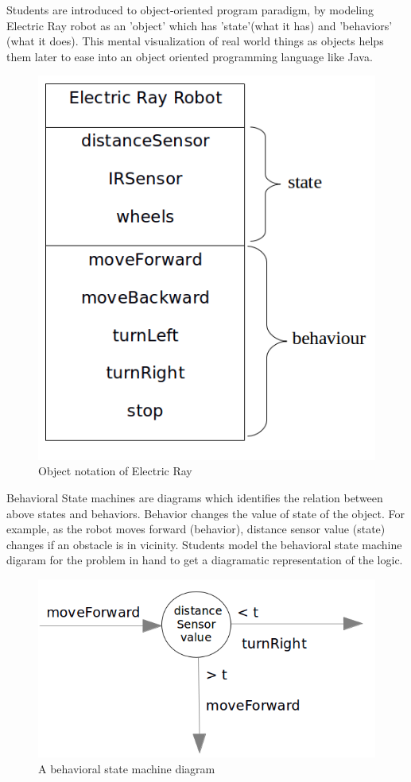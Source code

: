\documentclass[conference]{IEEEtran}
\begin{document}
Students are introduced to object-oriented program paradigm, by modeling Electric Ray robot as an 'object' which has 'state'(what it has) and 'behaviors' (what it does). This mental visualization of real world things as objects helps them later to ease into an object oriented programming language like Java.

\begin{figure}[h]
\centering
\includegraphics[scale=0.2]{Fig_06.png}
\caption{Object notation of Electric Ray}
\end{figure}

Behavioral State machines are diagrams which identifies the relation between above states and behaviors. Behavior changes the value of state of the object. For example, as the robot moves forward (behavior), distance sensor value (state) changes if an obstacle is in vicinity. Students model the behavioral state machine digaram for the problem in hand to get a diagramatic representation of the logic.

\begin{figure}[h]
\centering
\includegraphics[scale=0.2]{Fig_07.png}
\caption{A behavioral state machine diagram}
\end{figure}
\end{document}
